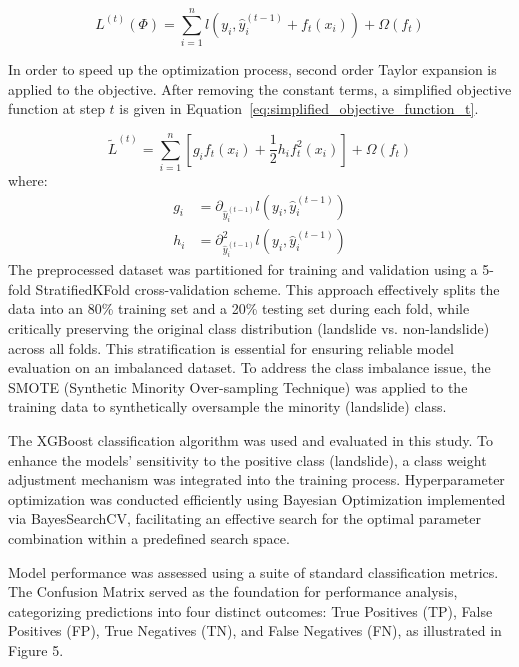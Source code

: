 \begin{equation} \label{eq:objective_function_t}
L^{(t)}(\Phi) = \sum_{i=1}^n l(y_i, \hat{y}_i^{(t-1)} + f_t(x_i)) + \Omega(f_t)
\end{equation}

In order to speed up the optimization process, second order Taylor expansion is applied to the objective. After removing the constant terms, a simplified objective function at step $t$ is given in Equation~\ref{eq:simplified_objective_function_t}.

\begin{equation} \label{eq:simplified_objective_function_t}
\tilde{L}^{(t)} = \sum_{i=1}^n \left[ g_i f_t(x_i) + \frac{1}{2} h_i f_t^2(x_i) \right] + \Omega(f_t)
\end{equation}
where:
\begin{align} \label{eq:g_h_definitions}
g_i &= \partial_{\hat{y}_i^{(t-1)}} l(y_i, \hat{y}_i^{(t-1)}) \\
h_i &= \partial_{\hat{y}_i^{(t-1)}}^2 l(y_i, \hat{y}_i^{(t-1)})
\end{align}
The preprocessed dataset was partitioned for training and validation using a 5-fold StratifiedKFold cross-validation scheme\cite{mthd06}. This approach effectively splits the data into an 80\% training set and a 20\% testing set during each fold, while critically preserving the original class distribution (landslide vs. non-landslide) across all folds. This stratification is essential for ensuring reliable model evaluation on an imbalanced dataset. To address the class imbalance issue, the SMOTE (Synthetic Minority Over-sampling Technique) was applied to the training data to synthetically oversample the minority (landslide) class\cite{mthd07}.

The XGBoost classification algorithm was used and evaluated in this study. To enhance the models' sensitivity to the positive class (landslide), a class weight adjustment mechanism was integrated into the training process. Hyperparameter optimization was conducted efficiently using Bayesian Optimization implemented via BayesSearchCV\cite{mthd08}, facilitating an effective search for the optimal parameter combination within a predefined search space.

Model performance was assessed using a suite of standard classification metrics. The Confusion Matrix served as the foundation for performance analysis\cite{mthd09}, categorizing predictions into four distinct outcomes: True Positives (TP), False Positives (FP), True Negatives (TN), and False Negatives (FN), as illustrated in Figure 5.

